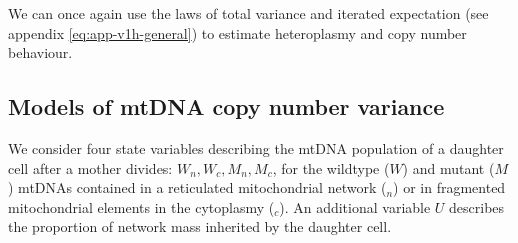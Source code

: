 \documentclass{article}
\begin{document}
We can once again use the laws of total variance and iterated expectation  (see appendix \ref{eq:app-v1h-general}) to estimate heteroplasmy and copy number behaviour.



\clearpage
\newpage

\begin{appendices}
\section{Models of mtDNA copy number variance}
 We consider four state variables describing the mtDNA population of a daughter cell after a mother divides: $W_n, W_c, M_n, M_c$, for the wildtype ($W$) and mutant ($M$) mtDNAs contained in a reticulated mitochondrial network (${}_n$) or in fragmented mitochondrial elements in the cytoplasmy (${}_c$). An additional variable $U$ describes the proportion of network mass inherited by the daughter cell.


\end{appendices}
\end{document}
